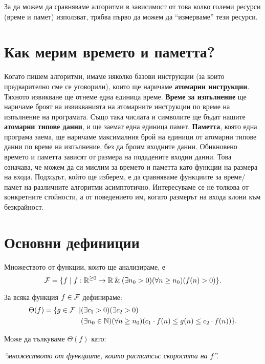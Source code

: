 За да можем да сравняваме алгоритми в зависимост от това колко големи ресурси (време и памет) използват, трябва първо да можем да ``измерваме'' тези ресурси.

\section{Как мерим времето и паметта?}

Когато пишем алгоритми, имаме няколко базови инструкции (за които предварително сме се уговорили), които ще наричаме \textbf{атомарни инструкции}.
Тяхното извикване ще отнеме една единица време.
\textbf{Време за изпълнение} ще наричаме броят на извикванията на атомарните инструкции по време на изпълнение на програмата.
Също така числата и символите ще бъдат нашите \textbf{атомарни типове данни}, и ще заемат една единица памет.
\textbf{Паметта}, която една програма заема, ще наричаме максималния брой на единици от атомарни типове данни по време на изпълнение, без да броим входните данни.
Обикновено времето и паметта зависят от размера на подадените входни данни.
Това означава, че можем да си мислим за времето и паметта като функции на размера на входа.
Подходът, който ще изберем, е да сравняваме функциите за време/памет на различните алгоритми асимптотично.
Интересуваме се не толкова от конкретните стойности, а от поведението им, когато размерът на входа клони към безкрайност.

\section{Основни дефиниции}
Множеството от функции, които ще анализираме, е
\[
  \mathcal{F} = \{ f \mid f : \mathbb{R}^{\geq 0} \rightarrow \mathbb{R} \: \& \: (\exists n_0 > 0) (\forall n \geq n_0) (f(n) > 0) \}.
\]


\begin{definition}
  За всяка функция $f \in \mathcal{F}$ дефинираме:
  \begin{align*}
    \Theta(f) = \{ g \in \mathcal{F} \: \mid & (\exists c_1 > 0)(\exists c_2 > 0)                                                        \\
                                       & (\exists n_0 \in \mathbb{N})(\forall n \geq n_0)(c_1 \cdot f(n) \leq g(n) \leq c_2 \cdot f(n))\}.
  \end{align*}

\end{definition}
Може да тълкуваме $\Theta(f)$ като:
\begin{center}
  \textit{``множеството от функциите, които растат\footnotemark[1] със скоростта на $f$''.}
\end{center}


